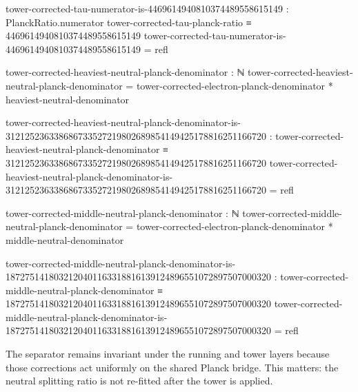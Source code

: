 \documentclass[11pt]{article}
\begin{document}
\begin{code}
tower-corrected-tau-numerator-is-4469614940810374489558615149 :
  PlanckRatio.numerator tower-corrected-tau-planck-ratio ≡
  4469614940810374489558615149
tower-corrected-tau-numerator-is-4469614940810374489558615149 = refl

tower-corrected-heaviest-neutral-planck-denominator : ℕ
tower-corrected-heaviest-neutral-planck-denominator =
  tower-corrected-electron-planck-denominator * heaviest-neutral-denominator

tower-corrected-heaviest-neutral-planck-denominator-is-312125236338686733527219802689854149425178816251166720 :
  tower-corrected-heaviest-neutral-planck-denominator ≡
  312125236338686733527219802689854149425178816251166720
tower-corrected-heaviest-neutral-planck-denominator-is-312125236338686733527219802689854149425178816251166720 = refl

tower-corrected-middle-neutral-planck-denominator : ℕ
tower-corrected-middle-neutral-planck-denominator =
  tower-corrected-electron-planck-denominator * middle-neutral-denominator

tower-corrected-middle-neutral-planck-denominator-is-1872751418032120401163318816139124896551072897507000320 :
  tower-corrected-middle-neutral-planck-denominator ≡
  1872751418032120401163318816139124896551072897507000320
tower-corrected-middle-neutral-planck-denominator-is-1872751418032120401163318816139124896551072897507000320 = refl
\end{code}

The separator remains invariant under the running and tower layers because
those corrections act uniformly on the shared Planck bridge.  This matters:
the neutral splitting ratio is not re-fitted after the tower is applied.
\end{document}
